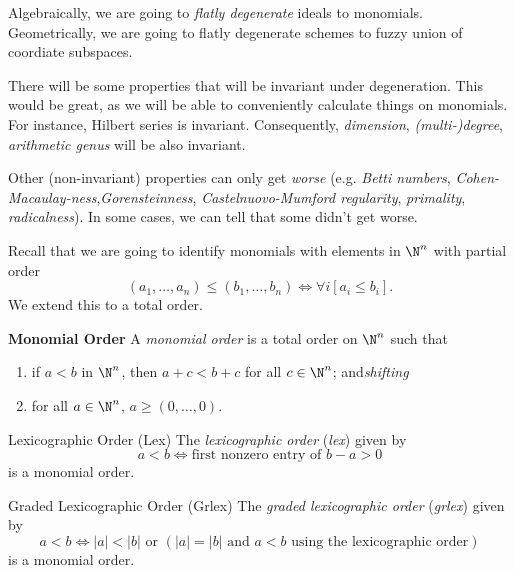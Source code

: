 \documentclass[co439]{subfiles}
\begin{document}
    Algebraically, we are going to \textit{flatly degenerate} ideals to monomials. Geometrically, we are going to flatly degenerate schemes to fuzzy union of coordiate subspaces.
    
    There will be some properties that will be invariant under degeneration. This would be great, as we will be able to conveniently calculate things on monomials. For instance, Hilbert series is invariant. Consequently, \textit{dimension}, \textit{(multi-)degree}, \textit{arithmetic genus} will be also invariant.

    Other (non-invariant) properties can only get \textit{worse} (e.g. \textit{Betti numbers}, \textit{Cohen-Macaulay-ness},\textit{Gorensteinness}, \textit{Castelnuovo-Mumford regularity},  \textit{primality}, \textit{radicalness}). In some cases, we can tell that some didn't get worse.

    Recall that we are going to identify monomials with elements in $\N^n$ with partial order
    \begin{equation*}
        \left( a_1,\ldots,a_n \right)\leq \left( b_1,\ldots,b_n \right)\iff \forall i\left[ a_i\leq b_i \right].
    \end{equation*}
    We extend this to a total order.

    \begin{definition}{\textbf{Monomial Order}}
        A \emph{monomial order} is a total order on $\N^n$ such that
        \begin{enumerate}
            \item if $a<b$ in $\N^n$, then $a+c<b+c$ for all $c\in\N^n$; and\hfill\textit{shifting}
            \item for all $a\in\N^n$, $a\geq \left( 0,\ldots,0 \right)$.
        \end{enumerate}
    \end{definition}
    
    \begin{example}{Lexicographic Order (Lex)}
        The \emph{lexicographic order} (\emph{lex}) given by
        \begin{equation*}
            a < b \iff \text{first nonzero entry of $b-a>0$}
        \end{equation*}
        is a monomial order.
    \end{example}

    \rruleline

    \clearpage

    \begin{example}{Graded Lexicographic Order (Grlex)}
        The \emph{graded lexicographic order} (\emph{grlex}) given by
        \begin{equation*}
            a<b\iff\text{$\left| a \right|<\left| b \right|$ or $\left( \left| a \right|=\left| b \right|\text{ and $a<b$ using the lexicographic order} \right)$}
        \end{equation*}
        is a monomial order.
    \end{example}
\end{document}
